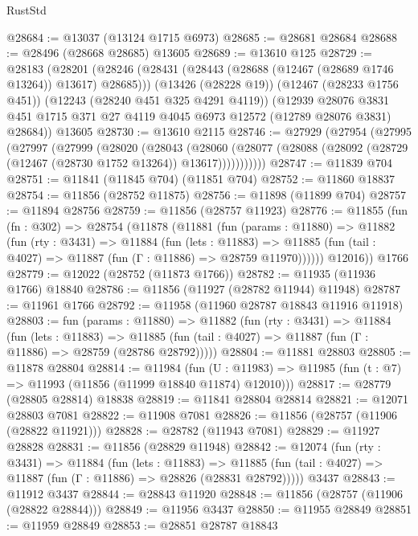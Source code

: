 \begin{lexlean}{RustStd}
\begin{coremodule}
@28684 := @13037 (@13124 @1715 @6973)
@28685 := @28681 @28684
@28688 := @28496 (@28668 @28685) @13605
@28689 := @13610 @125
@28729 := @28183
    (@28201
      (@28246 (@28431 (@28443 (@28688 (@12467 (@28689 @1746 @13264)) @13617) @28685)))
      (@13426 (@28228 @19))
      (@12467 (@28233 @1756 @451))
      (@12243 (@28240 @451 @325 @4291 @4119))
      (@12939
        @28076
        @3831
        @451
        @1715
        @371
        @27
        @4119
        @4045
        @6973
        @12572
        (@12789 @28076 @3831)
        @28684))
    @13605
@28730 := @13610 @2115
@28746 := @27929
    (@27954
      (@27995
        (@27997
          (@27999
            (@28020
              (@28043
                (@28060
                  (@28077 (@28088 (@28092 (@28729 (@12467 (@28730 @1752 @13264)) @13617)))))))))))
@28747 := @11839 @704
@28751 := @11841 (@11845 @704) (@11851 @704)
@28752 := @11860 @18837
@28754 := @11856 (@28752 @11875)
@28756 := @11898 (@11899 @704)
@28757 := @11894 @28756
@28759 := @11856 (@28757 @11923)
@28776 := @11855
    (fun (fn : @302) =>
    @28754
      (@11878
        (@11881
          (fun (params : @11880) =>
          @11882
            (fun (rty : @3431) =>
            @11884
              (fun (lets : @11883) =>
              @11885 (fun (tail : @4027) => @11887 (fun (Γ : @11886) => @28759 @11970))))))
        @12016))
    @1766
@28779 := @12022 (@28752 (@11873 @1766))
@28782 := @11935 (@11936 @1766) @18840
@28786 := @11856 (@11927 (@28782 @11944) @11948)
@28787 := @11961 @1766
@28792 := @11958 (@11960 @28787 @18843 @11916 @11918)
@28803 := fun (params : @11880) =>
  @11882
    (fun (rty : @3431) =>
    @11884
      (fun (lets : @11883) =>
      @11885 (fun (tail : @4027) => @11887 (fun (Γ : @11886) => @28759 (@28786 @28792)))))
@28804 := @11881 @28803
@28805 := @11878 @28804
@28814 := @11984
    (fun (U : @11983) => @11985 (fun (t : @7) => @11993 (@11856 (@11999 @18840 @11874) @12010)))
@28817 := @28779 (@28805 @28814) @18838
@28819 := @11841 @28804 @28814
@28821 := @12071 @28803 @7081
@28822 := @11908 @7081
@28826 := @11856 (@28757 (@11906 (@28822 @11921)))
@28828 := @28782 (@11943 @7081)
@28829 := @11927 @28828
@28831 := @11856 (@28829 @11948)
@28842 := @12074
    (fun (rty : @3431) =>
    @11884
      (fun (lets : @11883) =>
      @11885 (fun (tail : @4027) => @11887 (fun (Γ : @11886) => @28826 (@28831 @28792)))))
    @3437
@28843 := @11912 @3437
@28844 := @28843 @11920
@28848 := @11856 (@28757 (@11906 (@28822 @28844)))
@28849 := @11956 @3437
@28850 := @11955 @28849
@28851 := @11959 @28849
@28853 := @28851 @28787 @18843

\end{coremodule}
\end{lexlean}
